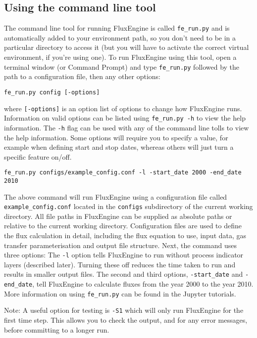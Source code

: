 \documentclass[]{scrartcl}
\begin{document}
\subsection{Using the command line tool}
The command line tool for running FluxEngine is called \texttt{fe\_run.py} and is automatically added to your environment path, so you don't need to be in a particular directory to access it (but you will have to activate the correct virtual environment, if you're using one). To run FluxEngine using this tool, open a terminal window (or Command Prompt) and type \texttt{fe\_run.py} followed by the path to a configuration file, then any other options:
\begin{lstlisting}
fe_run.py config [-options]
\end{lstlisting}
where \texttt{[-options]} is an option list of options to change how FluxEngine runs. Information on valid options can be listed using \texttt{fe\_run.py -h} to view the help information. The \texttt{-h} flag can be used with any of the command line tolls to view the help information. Some options will require you to specify a value, for example when defining start and stop dates, whereas others will just turn a specific feature on/off.

\begin{lstlisting}
fe_run.py configs/example_config.conf -l -start_date 2000 -end_date 2010
\end{lstlisting}

The above command will run FluxEngine using a configuration file called \texttt{example\_config.conf} located in the \texttt{configs} subdirectory of the current working directory. All file paths in FluxEngine can be supplied as absolute paths or relative to the current working directory. Configuration files are used to define the flux calculation in detail, including the flux equation to use, input data, gas transfer parameterisation and output file structure. Next, the command uses three options: The \texttt{-l} option tells FluxEngine to run without process indicator layers (described later). Turning these off reduces the time taken to run and results in smaller output files. The second and third options, \texttt{-start\_date} and \texttt{-end\_date}, tell FluxEngine to calculate fluxes from the year 2000 to the year 2010. More information on using \texttt{fe\_run.py} can be found in the Jupyter tutorials.

Note: A useful option for testing is \texttt{-S1} which will only run FluxEngine for the first time step. This allows you to check the output, and for any error messages, before committing to a longer run.
\end{document}
